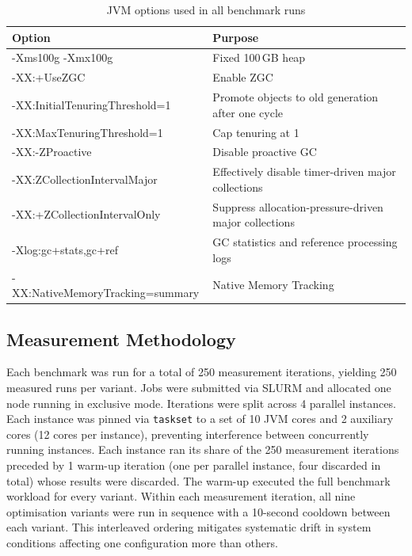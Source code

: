\begin{table}[t]
\centering
\small
\caption{\ac{JVM} options used in all benchmark runs}
\label{tab:jvm-options}
\begingroup
\renewcommand{\arraystretch}{1.15}
\begin{tabularx}{\textwidth}{@{}>{\hsize=1.35\hsize\raggedright\arraybackslash\ttfamily}X>{\hsize=0.65\hsize\raggedright\arraybackslash}X@{}}
\toprule
\textbf{Option} & \textbf{Purpose} \\
\midrule
-Xms100g -Xmx100g    & Fixed 100\,GB heap \\
-XX:+UseZGC           & Enable \ac{ZGC} \\
-XX:InitialTenuringThreshold=1 & Promote objects to old generation after one cycle \\
-XX:MaxTenuringThreshold=1     & Cap tenuring at 1 \\
-XX:-ZProactive       & Disable proactive \ac{GC} \\
-XX:ZCollectionIntervalMajor\allowbreak=315360000 & Effectively disable timer-driven major collections \\
-XX:+ZCollectionIntervalOnly   & Suppress allocation-pressure-driven major collections \\
-Xlog:gc+stats,gc+ref & \ac{GC} statistics and reference processing logs \\
-XX:NativeMemoryTracking=summary & Native Memory Tracking \\
\bottomrule
\end{tabularx}
\endgroup
\normalsize
\end{table}

\subsection{Measurement Methodology}
\label{subsec:eval-method}

Each benchmark was run for a total of 250 measurement iterations, yielding 250 measured runs per variant. Jobs were submitted via \ac{SLURM} and allocated one node running in exclusive mode. Iterations were split across 4 parallel instances. Each instance was pinned via \texttt{taskset} to a set of 10 \ac{JVM} cores and 2 auxiliary cores (12 cores per instance), preventing interference between concurrently running instances. Each instance ran its share of the 250 measurement iterations preceded by 1 warm-up iteration (one per parallel instance, four discarded in total) whose results were discarded. The warm-up executed the full benchmark workload for every variant. Within each measurement iteration, all nine optimisation variants were run in sequence with a 10-second cooldown between each variant. This interleaved ordering mitigates systematic drift in system conditions affecting one configuration more than others.

